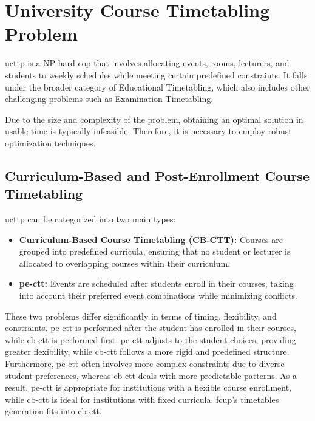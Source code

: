 \section{University Course Timetabling Problem}

\ac{ucttp} is a NP-hard \ac{cop} that involves allocating events, rooms, lecturers, and students to weekly schedules while meeting certain predefined constraints. It falls under the broader category of Educational Timetabling, which also includes other challenging problems such as Examination Timetabling. 

Due to the size and complexity of the problem, obtaining an optimal solution in usable time is typically infeasible. Therefore, it is necessary to employ robust optimization techniques.

\subsection{Curriculum-Based and Post-Enrollment Course Timetabling}

\ac{ucttp} can be categorized into two main types:

\begin{itemize}
\item \textbf{Curriculum-Based Course Timetabling (CB-CTT):} Courses are grouped into predefined curricula, ensuring that no student or lecturer is allocated to overlapping courses within their curriculum.

\item \textbf{\ac{pe-ctt}:} Events are scheduled after students enroll in their courses, taking into account their preferred event combinations while minimizing conflicts.
\end{itemize}

These two problems differ significantly in terms of timing, flexibility, and constraints. \ac{pe-ctt} is performed after the student has enrolled in their courses, while \ac{cb-ctt} is performed first. \ac{pe-ctt} adjusts to the student choices, providing greater flexibility, while \ac{cb-ctt} follows a more rigid and predefined structure. Furthermore, \ac{pe-ctt} often involves more complex constraints due to diverse student preferences, whereas \ac{cb-ctt} deals with more predictable patterns. As a result, \ac{pe-ctt} is appropriate for institutions with a flexible course enrollment, while \ac{cb-ctt} is ideal for institutions with fixed curricula. \ac{fcup}'s timetables generation fits into \ac{cb-ctt}.

